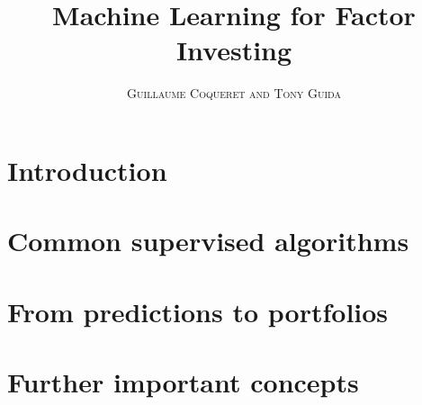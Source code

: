 \documentclass[a4paper,11pt,oneside]{book}
\title{\Huge \textbf{Machine Learning for Factor Investing}}
\author{\textsc{Guillaume Coqueret and Tony Guida}}
\renewcommand\section{\part}
\begin{document}
\sloppy

\frontmatter
\maketitle

\tableofcontents

\mainmatter

% 
% 

\section{Introduction}













\section{Common supervised algorithms}















\section{From predictions to portfolios}











\section{Further important concepts}
\end{document}
